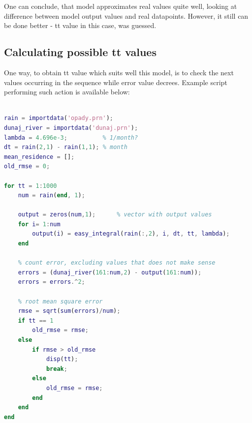 \documentclass[onecolumn]{article}
\begin{document}
\noindent{}

One can conclude, that model approximates real values quite well, looking at difference between model output values and real datapoints. However, it still can be done better - tt value in this case, was guessed. 

\subsection{Calculating possible tt values}
One way, to obtain tt value which suits well this model, is to check the next values occurring in the sequence while error value decrees. Example script performing such action is available below:
\begin{lstlisting}[language=Matlab,frame=single,label={lst:autocorr},breaklines=true,caption={Convolutional integral implementation with exponential transit function}]

rain = importdata('opady.prn');
dunaj_river = importdata('dunaj.prn');
lambda = 4.696e-3;          % 1/month?
dt = rain(2,1) - rain(1,1); % month
mean_residence = [];
old_rmse = 0;

for tt = 1:1000
    num = rain(end, 1);

    output = zeros(num,1);      % vector with output values
    for i= 1:num
        output(i) = easy_integral(rain(:,2), i, dt, tt, lambda);
    end
    
    % count error, excluding values that does not make sense
    errors = (dunaj_river(161:num,2) - output(161:num));
    errors = errors.^2;
    
    % root mean square error
    rmse = sqrt(sum(errors)/num);
    if tt == 1
        old_rmse = rmse;
    else
        if rmse > old_rmse
            disp(tt);
            break;
        else
            old_rmse = rmse;
        end
    end
end

\end{lstlisting}
\end{document}
